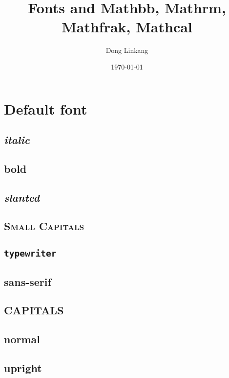 \documentclass{article}
\title{Fonts and Mathbb, Mathrm, Mathfrak, Mathcal}
\author{Dong Linkang}
\date{\today}
\begin{document}
    \maketitle

    \tableofcontents

    \section{Default font}
    \subsection{\textit{italic}}
    \textit{\lipsum[1]} 
    \subsection{\textbf{bold}}
    \textbf{\lipsum[1]}
    \subsection{\textsl{slanted}}
    \textsl{\lipsum[1]}
    \subsection{\textsc{Small Capitals}}
    \textsc{\lipsum[1]}
    \subsection{\texttt{typewriter}}
    \texttt{\lipsum[1]}
    \subsection{\textsf{sans-serif}}
    \textsf{\lipsum[1]}
    \subsection{\uppercase{CAPITALS}}
    \uppercase{\lipsum[1]}
    \subsection{\textnormal{normal}}
    \textnormal{\lipsum[1]}
    \subsection{\textup{upright}}
    \textup{\lipsum[1]}
\end{document}

